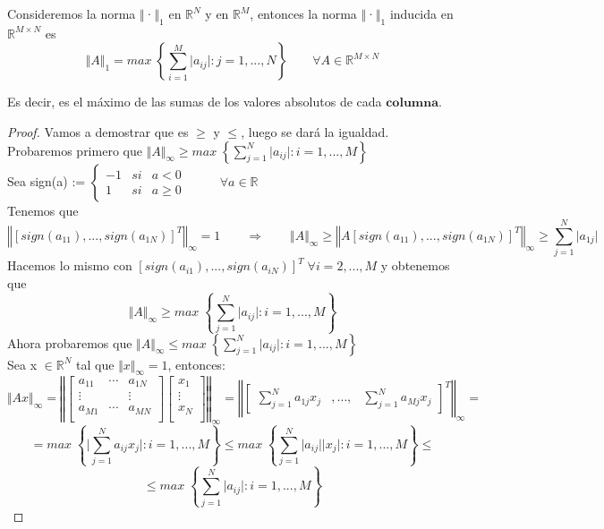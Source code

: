 \begin{nprop}
Consideremos la norma $\Vert$·$\Vert _1$ en $\mathbb{R}^N$ y en $\mathbb{R}^M$, entonces la norma $\Vert$·$\Vert _1$ inducida en $\mathbb{R}^{M \times N}$ es
\[ \Vert A \Vert _1 = max \; \left\lbrace \sum_{i=1}^M \vert a_{ij} \vert : j = 1,...,N \right\rbrace \qquad \forall A \in \mathbb{R}^{M \times N} \]
\end{nprop}

Es decir, es el máximo de las sumas de los valores absolutos de cada $\textbf{columna}$.

\begin{proof} Vamos a demostrar que es $\geq$ y $\leq$, luego se dará la igualdad.\\
Probaremos primero que $ \Vert A \Vert _\infty \geq max \; \left\lbrace \sum_{j=1}^N \vert a_{ij} \vert : i = 1,...,M \right\rbrace $\\
Sea sign(a) := $\left\{ \begin{array}{lcc}
-1 & si & a < 0 \\
1 & si & a \geq 0
\end{array}
\right.$ $\qquad$ $\forall a \in \mathbb{R}$\\
Tenemos que
\[ \left\Vert \left[ sign(a_{11}),...,sign(a_{1N}) \right] ^T \right\Vert _\infty = 1 \qquad \Rightarrow \qquad \Vert A \Vert _\infty \geq \left\Vert A \left[ sign(a_{11}),...,sign(a_{1N}) \right] ^T \right\Vert _\infty \geq \sum_{j=1}^N \vert a_{1j} \vert \]
Hacemos lo mismo con $\left[ sign(a_{i1}),...,sign(a_{iN}) \right] ^T \; \forall i = 2,...,M$ y obtenemos que
\[ \Vert A \Vert _\infty \geq max \; \left\lbrace \sum_{j=1}^N \vert a_{ij} \vert : i = 1,...,M \right\rbrace \]
Ahora probaremos que $ \Vert A \Vert _\infty \leq max \; \left\lbrace \sum_{j=1}^N \vert a_{ij} \vert : i = 1,...,M \right\rbrace $\\
Sea x $\in \mathbb{R}^N$ tal que $\Vert x \Vert _\infty = 1$, entonces:
\[ \Vert Ax \Vert _\infty = \left\Vert 
\begin{bmatrix} 
a_{11} &  \cdots & a_{1N} \\
\vdots & & \vdots 
\\ a_{M1} & \cdots & a_{MN} \\ \end{bmatrix} 
\begin{bmatrix}
x_1 \\
\vdots \\
x_N \\
\end{bmatrix}
\right\Vert _\infty = \left\Vert 
\begin{bmatrix}
\sum_{j=1}^N a_{1j}x_j & ,\ldots , & \sum_{j=1}^N a_{Mj}x_j 
\end{bmatrix} ^T
\right\Vert _\infty = \] \[= max \; \left\lbrace \vert \sum_{j=1}^N a_{ij}x_j \vert : i = 1,...,M \right\rbrace \leq max \; \left\lbrace \sum_{j=1}^N \vert a_{ij} \vert \vert x_j \vert : i = 1,...,M \right\rbrace \leq \] \[ \leq max \; \left\lbrace \sum_{j=1}^N \vert a_{ij} \vert : i = 1,...,M \right\rbrace \] 
\end{proof}

